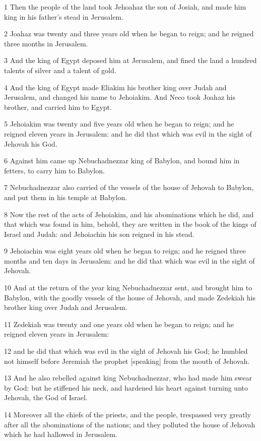 \par 1 Then the people of the land took Jehoahaz the son of Josiah, and made him king in his father's stead in Jerusalem.
\par 2 Joahaz was twenty and three years old when he began to reign; and he reigned three months in Jerusalem.
\par 3 And the king of Egypt deposed him at Jerusalem, and fined the land a hundred talents of silver and a talent of gold.
\par 4 And the king of Egypt made Eliakim his brother king over Judah and Jerusalem, and changed his name to Jehoiakim. And Neco took Joahaz his brother, and carried him to Egypt.
\par 5 Jehoiakim was twenty and five years old when he began to reign; and he reigned eleven years in Jerusalem: and he did that which was evil in the sight of Jehovah his God.
\par 6 Against him came up Nebuchadnezzar king of Babylon, and bound him in fetters, to carry him to Babylon.
\par 7 Nebuchadnezzar also carried of the vessels of the house of Jehovah to Babylon, and put them in his temple at Babylon.
\par 8 Now the rest of the acts of Jehoiakim, and his abominations which he did, and that which was found in him, behold, they are written in the book of the kings of Israel and Judah: and Jehoiachin his son reigned in his stead.
\par 9 Jehoiachin was eight years old when he began to reign; and he reigned three months and ten days in Jerusalem: and he did that which was evil in the sight of Jehovah.
\par 10 And at the return of the year king Nebuchadnezzar sent, and brought him to Babylon, with the goodly vessels of the house of Jehovah, and made Zedekiah his brother king over Judah and Jerusalem.
\par 11 Zedekiah was twenty and one years old when he began to reign; and he reigned eleven years in Jerusalem:
\par 12 and he did that which was evil in the sight of Jehovah his God; he humbled not himself before Jeremiah the prophet [speaking] from the mouth of Jehovah.
\par 13 And he also rebelled against king Nebuchadnezzar, who had made him swear by God: but he stiffened his neck, and hardened his heart against turning unto Jehovah, the God of Israel.
\par 14 Moreover all the chiefs of the priests, and the people, trespassed very greatly after all the abominations of the nations; and they polluted the house of Jehovah which he had hallowed in Jerusalem.
